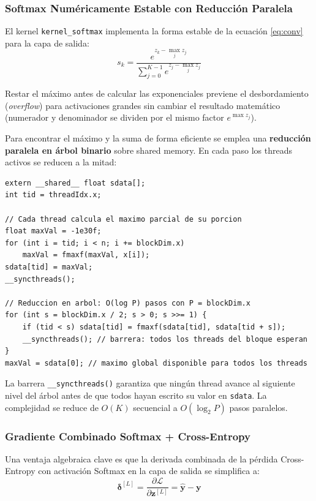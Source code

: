 \documentclass[12pt,a4paper]{article}
\begin{document}
\subsubsection{Softmax Numéricamente Estable con Reducción Paralela}

El kernel \texttt{kernel\_softmax} implementa la forma estable de la ecuación
\eqref{eq:conv} para la capa de salida:
\begin{equation}
  s_k = \frac{e^{z_k - \max_j z_j}}{\displaystyle\sum_{j=0}^{K-1} e^{z_j - \max_j z_j}}
  \label{eq:softmax}
\end{equation}

Restar el máximo antes de calcular las exponenciales previene el desbordamiento
(\textit{overflow}) para activaciones grandes sin cambiar el resultado matemático
(numerador y denominador se dividen por el mismo factor $e^{\max z_j}$).

Para encontrar el máximo y la suma de forma eficiente se emplea una
\textbf{reducción paralela en árbol binario} sobre shared memory. En cada paso los
threads activos se reducen a la mitad:

\begin{lstlisting}[caption={Reducción paralela del máximo en shared memory}]
extern __shared__ float sdata[];
int tid = threadIdx.x;

// Cada thread calcula el maximo parcial de su porcion
float maxVal = -1e30f;
for (int i = tid; i < n; i += blockDim.x)
    maxVal = fmaxf(maxVal, x[i]);
sdata[tid] = maxVal;
__syncthreads();

// Reduccion en arbol: O(log P) pasos con P = blockDim.x
for (int s = blockDim.x / 2; s > 0; s >>= 1) {
    if (tid < s) sdata[tid] = fmaxf(sdata[tid], sdata[tid + s]);
    __syncthreads(); // barrera: todos los threads del bloque esperan
}
maxVal = sdata[0]; // maximo global disponible para todos los threads
\end{lstlisting}

La barrera \texttt{\_\_syncthreads()} garantiza que ningún thread avance al siguiente
nivel del árbol antes de que todos hayan escrito su valor en \texttt{sdata}. La
complejidad se reduce de $O(K)$ secuencial a $O(\log_2 P)$ pasos paralelos.

\subsubsection{Gradiente Combinado Softmax + Cross-Entropy}

Una ventaja algebraica clave es que la derivada combinada de la pérdida
Cross-Entropy con activación Softmax en la capa de salida se simplifica a:
\begin{equation}
  \boldsymbol{\delta}^{[L]} = \frac{\partial \mathcal{L}}{\partial \mathbf{z}^{[L]}}
  = \hat{\mathbf{y}} - \mathbf{y}
  \label{eq:ce_softmax_grad}
\end{equation}
\end{document}
